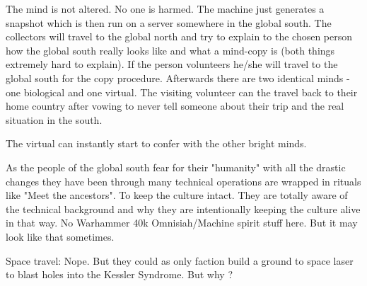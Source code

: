 The mind is not altered. No one is harmed. The machine just generates a snapshot which is then run on a server somewhere in the global south.
The collectors will travel to the global north and try to explain to the chosen person how the global south really looks like and what a mind-copy is (both things extremely hard to explain). If the person volunteers he/she will travel to the global south for the copy procedure. Afterwards there are two identical minds - one biological and one virtual.
The visiting volunteer can the travel back to their home country after vowing to never tell someone about their trip and the real situation in the south.

The virtual can instantly start to confer with the other bright minds.

As the people of the global south fear for their "humanity" with all the drastic changes they have been through many technical operations are wrapped in rituals like "Meet the ancestors". To keep the culture intact. They are totally aware of the technical background and why they are intentionally keeping the culture alive in that way. No Warhammer 40k Omnisiah/Machine spirit stuff here. But it may look like that sometimes.

Space travel: Nope. But they could as only faction build a ground to space laser to blast holes into the Kessler Syndrome. But why ?
